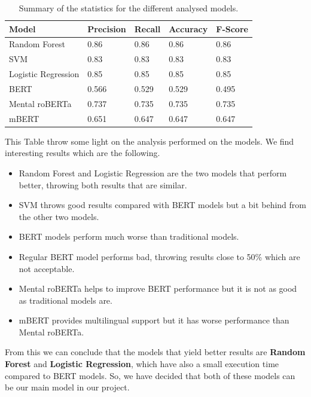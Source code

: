 \begin{table}[h]
\centering
\begin{tabular}{|l|l|l|l|l|}
\hline
\textbf{Model}      & \textbf{Precision} & \textbf{Recall} & \textbf{Accuracy} & \textbf{F-Score} \\ \hline
Random Forest       & 0.86               & 0.86            & 0.86              & 0.86             \\ \hline
SVM                 & 0.83               & 0.83            & 0.83              & 0.83             \\ \hline
Logistic Regression & 0.85               & 0.85            & 0.85              & 0.85             \\ \hline
BERT                & 0.566              & 0.529           & 0.529             & 0.495            \\ \hline
Mental roBERTa      & 0.737              & 0.735           & 0.735             & 0.735            \\ \hline
mBERT               & 0.651              & 0.647           & 0.647             & 0.647            \\ \hline
\end{tabular}
\caption{Summary of the statistics for the different analysed models.}
\label{tab:summarystatistics}
\end{table}

This Table throw some light on the analysis performed on the models. We find interesting results which are the following.

\begin{itemize}
    \item Random Forest and Logistic Regression are the two models that perform better, throwing both results that are similar.
    \item SVM throws good results compared with BERT models but a bit behind from the other two models.
    \item BERT models perform much worse than traditional models.
    \item Regular BERT model performs bad, throwing results close to 50\% which are not acceptable.
    \item Mental roBERTa helps to improve BERT performance but it is not as good as traditional models are.
    \item mBERT provides multilingual support but it has worse performance than Mental roBERTa.
\end{itemize}

From this we can conclude that the models that yield better results are \textbf{Random Forest} and \textbf{Logistic Regression}, which have also a small execution time compared to BERT models. So, we have decided that both of these models can be our main model in our project. 

